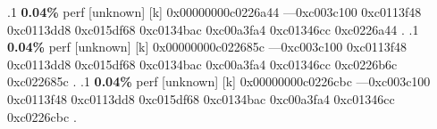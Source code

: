 \begin{profile}
{.1 \textbf{ 0.04\%} perf             [unknown]              [k] 0x00000000c0226a44\newline {} ---0xc003c100\newline {} 0xc0113f48\newline {} 0xc0113dd8\newline {} 0xc015df68\newline {} 0xc0134bac\newline {} 0xc00a3fa4\newline {} 0xc01346cc\newline {} 0xc0226a44\newline {} . 
.1 \textbf{ 0.04\%} perf             [unknown]              [k] 0x00000000c022685c\newline {} ---0xc003c100\newline {} 0xc0113f48\newline {} 0xc0113dd8\newline {} 0xc015df68\newline {} 0xc0134bac\newline {} 0xc00a3fa4\newline {} 0xc01346cc\newline {} 0xc0226b6c\newline {} 0xc022685c\newline {} . 
.1 \textbf{ 0.04\%} perf             [unknown]              [k] 0x00000000c0226cbc\newline {} ---0xc003c100\newline {} 0xc0113f48\newline {} 0xc0113dd8\newline {} 0xc015df68\newline {} 0xc0134bac\newline {} 0xc00a3fa4\newline {} 0xc01346cc\newline {} 0xc0226cbc\newline {} . 
}
\end{profile}
